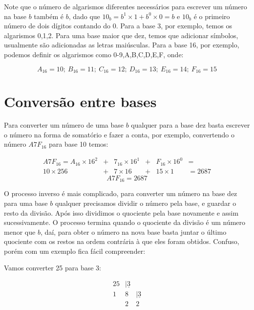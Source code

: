 \documentclass{report}
\theoremstyle{definition}
\begin{document}
Note que o número de algarismos diferentes necessários para escrever um número na base $b$ também é $b$, dado que $10_b = b^1 \times 1 + b^0 \times 0 = b$ e $10_b$ é o primeiro número de dois dígitos contando do 0. Para a base 3, por exemplo, temos os algarismos 0,1,2. Para uma base maior que dez, temos que adicionar símbolos, usualmente são adicionadas as letras maiúsculas. Para a base 16, por exemplo, podemos definir os algarismos como 0-9,A,B,C,D,E,F, onde:

\begin{equation*}
A_{16} = 10;\ B_{16} = 11;\ C_{16} = 12;\ D_{16} = 13;\ E_{16} = 14;\ F_{16} = 15
\end{equation*}

\section{Conversão entre bases}

Para converter um número de uma base $b$ qualquer para a base dez basta escrever o número na forma de somatório e fazer a conta, por exemplo, convertendo o número $A7F_{16}$ para base 10 temos:

\begin{align*}
A7F_{16} = A_{16} \times 16^2 & + & 7_{16} \times 16^1 & + & F_{16} \times 16^0 & = \\
10 \times 256 & + & 7 \times 16 & + & 15 \times 1 & = 2687
\end{align*}
\begin{equation*}
A7F_{16} = 2687
\end{equation*}

O processo inverso é mais complicado, para converter um número na base dez para uma base $b$ qualquer precisamos dividir o número pela base, e guardar o resto da divisão. Após isso dividimos o quociente pela base novamente e assim sucessivamente. O processo termina quando o quociente da divisão é um número menor que $b$, daí, para obter o número na nova base basta juntar o último quociente com os restos na ordem contrária à que eles foram obtidos. Confuso, porém com um exemplo fica fácil compreender:

Vamos converter 25 para base 3:

\[
    \begin{array}{rrr}
        25& |\underline{3}&   \\
         1&              8& |\underline{3}\\
          &              2&              2
    \end{array}
\]
\end{document}
